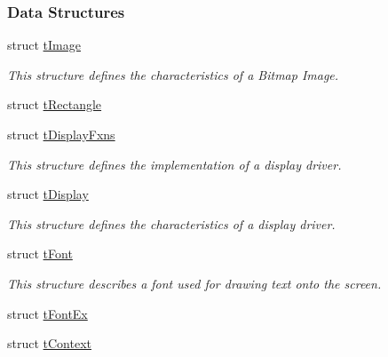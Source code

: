 \subsubsection*{Data Structures}
\begin{DoxyCompactItemize}
\item 
struct \hyperlink{structt_image}{t\+Image}
\begin{DoxyCompactList}\small\item\em This structure defines the characteristics of a Bitmap Image. \end{DoxyCompactList}\item 
struct \hyperlink{structt_rectangle}{t\+Rectangle}
\item 
struct \hyperlink{structt_display_fxns}{t\+Display\+Fxns}
\begin{DoxyCompactList}\small\item\em This structure defines the implementation of a display driver. \end{DoxyCompactList}\item 
struct \hyperlink{structt_display}{t\+Display}
\begin{DoxyCompactList}\small\item\em This structure defines the characteristics of a display driver. \end{DoxyCompactList}\item 
struct \hyperlink{structt_font}{t\+Font}
\begin{DoxyCompactList}\small\item\em This structure describes a font used for drawing text onto the screen. \end{DoxyCompactList}\item 
struct \hyperlink{structt_font_ex}{t\+Font\+Ex}
\item 
struct \hyperlink{structt_context}{t\+Context}
\end{DoxyCompactItemize}
